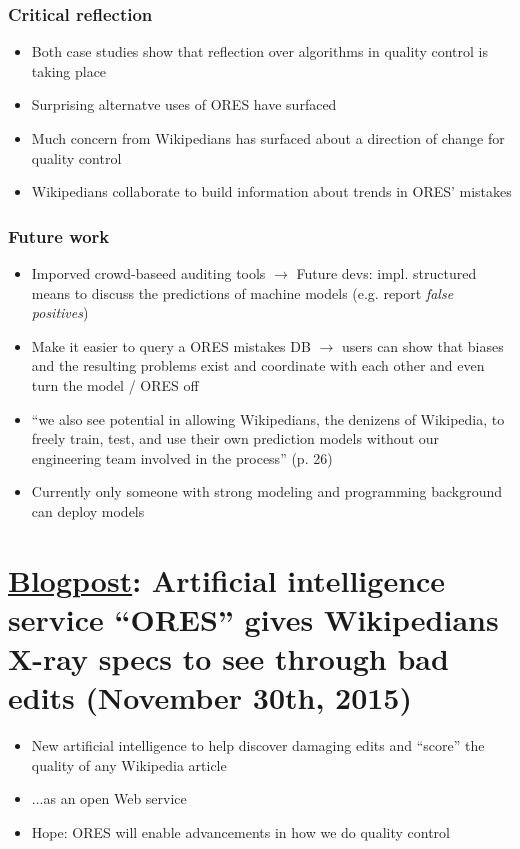 \documentclass[12pt,a4paper]{article}
\begin{document}
\subsubsection{Critical reflection}
\begin{itemize}
\item Both case studies show that reflection over algorithms in quality control is taking place
\item Surprising alternatve uses of ORES have surfaced
\item Much concern from Wikipedians has surfaced about a direction of change for quality control
\item Wikipedians collaborate to build information about trends in ORES' mistakes
\end{itemize}
\subsubsection{Future work}
\begin{itemize}
\item Imporved crowd-baseed auditing tools
\(\rightarrow\) Future devs: impl. structured means to discuss the predictions of machine models (e.g. report \textit{false positives})
\item Make it easier to query a ORES mistakes DB \(\rightarrow\) users can show that biases and the resulting problems exist and coordinate with each other and even turn the model / ORES off
\item ``we also see potential in allowing Wikipedians, the denizens of Wikipedia, to freely
train, test, and use their own prediction models without our engineering team involved in
the process'' (p. 26)
\item Currently only someone with strong modeling and programming background can deploy models
\end{itemize}

\section{\href{https://blog.wikimedia.org/2015/11/30/artificial-intelligence-x-ray-specs/}{Blogpost}: Artificial intelligence service ``ORES'' gives Wikipedians X-ray specs to see through bad edits (November 30th, 2015)}
\begin{itemize}
\item New artificial intelligence to help discover damaging edits and ``score'' the quality of any Wikipedia article
\item ...as an open Web service
\item Hope: ORES will enable advancements in how we do quality control
\end{itemize}
\end{document}
